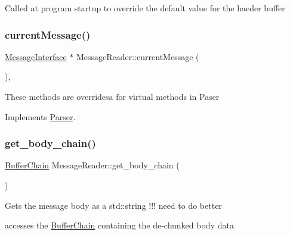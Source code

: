 Called at program startup to override the default value for the haeder buffer \mbox{\label{class_message_reader_a06ec9e561ff5cde8f4e1ffb0ff17cb1f}} 
\subsubsection{\texorpdfstring{current\+Message()}{currentMessage()}}
{\footnotesize\ttfamily \hyperlink{class_message_interface}{Message\+Interface} $\ast$ Message\+Reader\+::current\+Message (\begin{DoxyParamCaption}{ }\end{DoxyParamCaption})\hspace{0.3cm}{\ttfamily [protected]}, {\ttfamily [virtual]}}

These methods are overridesa for virtual methods in Paser 

Implements \hyperlink{class_parser_a7b3c3ac1cf86a5f9fdda1ecf06dcd4dc}{Parser}.

\mbox{\label{class_message_reader_ac480fcf3e6f5b1bb89b467d372a4e435}} 
\subsubsection{\texorpdfstring{get\+\_\+body\+\_\+chain()}{get\_body\_chain()}}
{\footnotesize\ttfamily \hyperlink{class_buffer_chain}{Buffer\+Chain} Message\+Reader\+::get\+\_\+body\+\_\+chain (\begin{DoxyParamCaption}{ }\end{DoxyParamCaption})}

Gets the message body as a std\+::string !!! need to do better

accesses the \hyperlink{class_buffer_chain}{Buffer\+Chain} containing the de-\/chunked body data \mbox{\label{class_message_reader_a93a38a06b77aea962b76fab6f9ba77e2}} 
